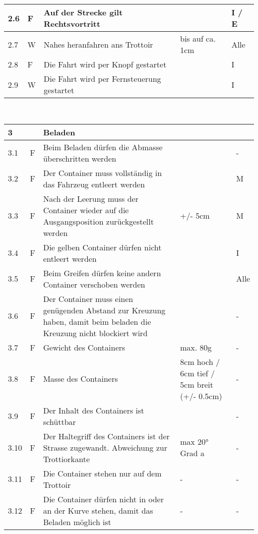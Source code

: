 \begin{center}
\begin{tabular}{|p{1cm}|p{0.5cm}|p{5cm}|p{5cm}|p{1.5cm}|}
 2.6 & F & Auf der Strecke gilt Rechtsvortritt & & I / E \\\hline
 2.7 & W & Nahes heranfahren ans Trottoir & bis auf ca. 1cm & Alle\\\hline
 2.8 & F & Die Fahrt wird per Knopf gestartet & & I\\\hline
 2.9 & W & Die Fahrt wird per Fernsteuerung gestartet & & I \\\hline
\end{tabular}\\[0.3cm]
\begin{tabular}{|p{1cm}|p{0.5cm}|p{5cm}|p{5cm}|p{1.5cm}|}\hline
 \textbf{3} & & \textbf{Beladen} & & \\\hline
 3.1 & F & Beim Beladen dürfen die Abmasse überschritten werden & & -\\\hline
 3.2 & F & Der Container muss vollständig in das Fahrzeug entleert werden & & M\\\hline
 3.3 & F & Nach der Leerung muss der Container wieder auf die Ausgangsposition zurückgestellt werden & +/- 5cm & M\\\hline
 3.4 & F & Die gelben Container dürfen nicht entleert werden & & I\\\hline
 3.5 & F & Beim Greifen dürfen keine andern Container verschoben werden & & Alle\\\hline
 3.6 & F & Der Container muss einen genügenden Abstand zur Kreuzung haben, damit beim beladen die Kreuzung nicht blockiert wird & & - \\\hline 
 3.7 & F & Gewicht des Containers & max. 80g & - \\\hline 
 3.8 & F & Masse des Containers& 8cm hoch  / 6cm tief / 5cm breit (+/- 0.5cm) & - \\\hline 
 3.9 & F & Der Inhalt des Containers ist schüttbar &  & - \\\hline 
 3.10 & F & Der Haltegriff des Containers ist der Strasse zugewandt. Abweichung zur Trottiorkante & max 20° Grad a  & - \\\hline 
 3.11 & F & Die Container stehen nur auf dem Trottoir & - & - \\\hline 
 3.12 & F & Die Container dürfen nicht in oder an der Kurve stehen, damit das Beladen möglich ist & - & - \\\hline 
\end{tabular}
\end{center}
